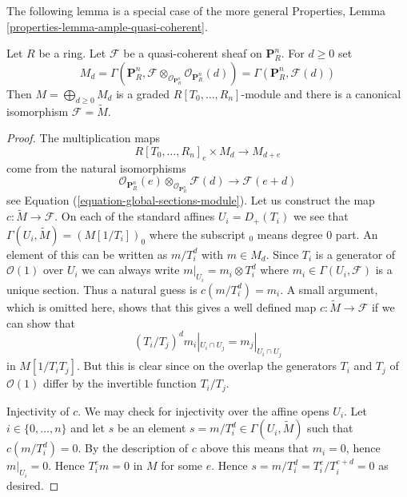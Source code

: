 \noindent
The following lemma is a special case of the more general
Properties, Lemma \ref{properties-lemma-ample-quasi-coherent}.

\begin{lemma}
\label{lemma-quasi-coherent-projective-space}
Let $R$ be a ring.
Let $\mathcal{F}$ be a quasi-coherent sheaf on $\mathbf{P}^n_R$.
For $d \geq 0$ set
$$
M_d
=
\Gamma(\mathbf{P}^n_R,
\mathcal{F} \otimes_{\mathcal{O}_{\mathbf{P}^n_R}}
\mathcal{O}_{\mathbf{P}^n_R}(d))
=
\Gamma(\mathbf{P}^n_R, \mathcal{F}(d))
$$
Then $M = \bigoplus_{d \geq 0} M_d$ is a graded $R[T_0, \ldots, R_n]$-module
and there is a canonical isomorphism $\mathcal{F} = \widetilde{M}$.
\end{lemma}

\begin{proof}
The multiplication maps
$$
R[T_0, \ldots, R_n]_e \times M_d \longrightarrow M_{d + e}
$$
come from the natural isomorphisms
$$
\mathcal{O}_{\mathbf{P}^n_R}(e)
\otimes_{\mathcal{O}_{\mathbf{P}^n_R}}
\mathcal{F}(d)
\longrightarrow
\mathcal{F}(e + d)
$$
see Equation (\ref{equation-global-sections-module}). Let us construct the
map $c : \widetilde{M} \to \mathcal{F}$. On each of the standard affines
$U_i = D_{+}(T_i)$ we see that $\Gamma(U_i, \widetilde{M}) = (M[1/T_i])_0$
where the subscript ${}_0$ means degree $0$ part. An element of this
can be written as $m/T_i^d$ with $m \in M_d$. Since $T_i$ is a generator
of $\mathcal{O}(1)$ over $U_i$ we can always write
$m|_{U_i} = m_i \otimes T_i^d$ where $m_i \in \Gamma(U_i, \mathcal{F})$
is a unique section. Thus a natural guess is $c(m/T_i^d) = m_i$.
A small argument, which is omitted here, shows that this gives a
well defined map $c : \widetilde{M} \to \mathcal{F}$ if we can
show that
$$
(T_i/T_j)^d m_i|_{U_i \cap U_j} = m_j|_{U_i \cap U_j}
$$
in $M[1/T_iT_j]$.
But this is clear since on the overlap the generators $T_i$ and
$T_j$ of $\mathcal{O}(1)$ differ by the invertible function $T_i/T_j$.

\medskip\noindent
Injectivity of $c$. We may check for injectivity over the affine opens
$U_i$. Let $i \in \{0, \ldots, n\}$
and let $s$ be an element $s = m/T_i^d \in \Gamma(U_i, \widetilde{M})$
such that $c(m/T_i^d) = 0$. By the description of $c$ above this means that
$m_i = 0$, hence $m|_{U_i} = 0$. Hence $T_i^em = 0$ in $M$ for some
$e$. Hence $s = m/T_i^d = T_i^e/T_i^{e + d} = 0$ as desired.


\end{proof}
